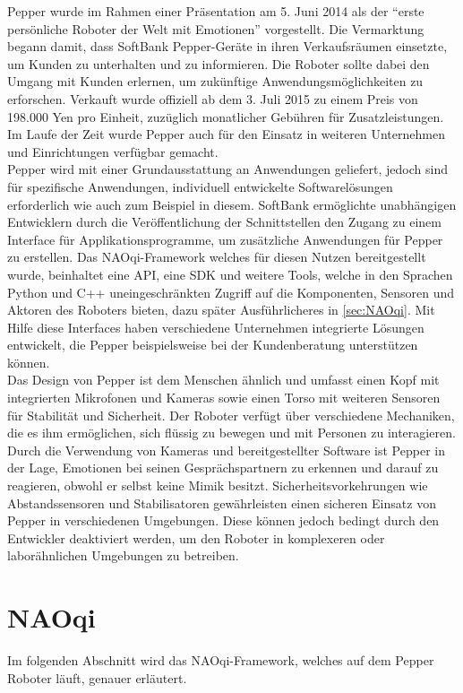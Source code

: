 \noindent
Pepper wurde im Rahmen einer Präsentation am 5. Juni 2014 als der ``erste persönliche Roboter der Welt mit Emotionen'' vorgestellt. Die Vermarktung begann damit, dass SoftBank Pepper-Geräte in ihren Verkaufsräumen einsetzte, um Kunden zu unterhalten und zu informieren. Die Roboter sollte dabei den Umgang mit Kunden erlernen, um zukünftige Anwendungsmöglichkeiten zu erforschen. Verkauft wurde offiziell ab dem 3. Juli 2015 zu einem Preis von 198.000 Yen pro Einheit, zuzüglich monatlicher Gebühren für Zusatzleistungen. Im Laufe der Zeit wurde Pepper auch für den Einsatz in weiteren Unternehmen und Einrichtungen verfügbar gemacht.
\\

\noindent
Pepper wird mit einer Grundausstattung an Anwendungen geliefert, jedoch sind für spezifische Anwendungen, individuell entwickelte Softwarelösungen erforderlich wie auch zum Beispiel in diesem. SoftBank ermöglichte unabhängigen Entwicklern durch die Veröffentlichung der Schnittstellen den Zugang zu einem Interface für Applikationsprogramme, um zusätzliche Anwendungen für Pepper zu erstellen. Das NAOqi-Framework welches für diesen Nutzen bereitgestellt wurde, beinhaltet eine \ac{API}, eine \ac{SDK} und weitere Tools, welche in den Sprachen Python und C++ uneingeschränkten Zugriff auf die Komponenten, Sensoren und Aktoren des Roboters bieten, dazu später Ausführlicheres in \autoref{sec:NAOqi}. Mit Hilfe diese Interfaces haben verschiedene Unternehmen integrierte Lösungen entwickelt, die Pepper beispielsweise bei der Kundenberatung unterstützen können.
\\

\noindent
Das Design von Pepper ist dem Menschen ähnlich und umfasst einen Kopf mit integrierten Mikrofonen und Kameras sowie einen Torso mit weiteren Sensoren für Stabilität und Sicherheit. Der Roboter verfügt über verschiedene Mechaniken, die es ihm ermöglichen, sich flüssig zu bewegen und mit Personen zu interagieren. Durch die Verwendung von Kameras und bereitgestellter Software ist Pepper in der Lage, Emotionen bei seinen Gesprächspartnern zu erkennen und darauf zu reagieren, obwohl er selbst keine Mimik besitzt. Sicherheitsvorkehrungen wie Abstandssensoren und Stabilisatoren gewährleisten einen sicheren Einsatz von Pepper in verschiedenen Umgebungen. Diese können jedoch bedingt durch den Entwickler deaktiviert werden, um den Roboter in komplexeren oder laborähnlichen Umgebungen zu betreiben.\\


\section{NAOqi}\label{sec:NAOqi}
Im folgenden Abschnitt wird das NAOqi-Framework, welches auf dem Pepper Roboter läuft, genauer erläutert.\\

